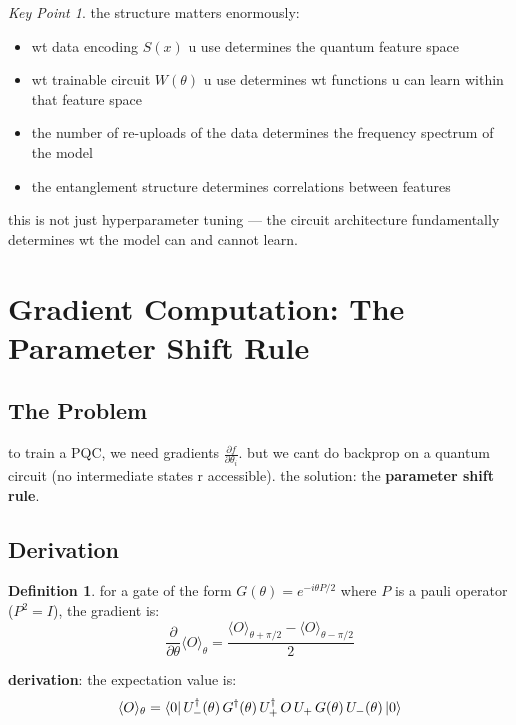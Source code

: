 \documentclass[11pt,a4paper]{article}
\theoremstyle{definition}
\newtheorem{definition}{Definition}[section]
\theoremstyle{remark}
\newtheorem*{keypoint}{Key Point}
\begin{document}
\begin{keypoint}
the structure matters enormously:
\begin{itemize}
    \item wt data encoding $S(x)$ u use determines the quantum feature space
    \item wt trainable circuit $W(\theta)$ u use determines wt functions u can learn within that feature space
    \item the number of re-uploads of the data determines the frequency spectrum of the model
    \item the entanglement structure determines correlations between features
\end{itemize}
this is not just hyperparameter tuning --- the circuit architecture fundamentally determines wt the model can and cannot learn.
\end{keypoint}

\section{Gradient Computation: The Parameter Shift Rule}

\subsection{The Problem}

to train a PQC, we need gradients $\frac{\partial f}{\partial \theta_i}$. but we cant do backprop on a quantum circuit (no intermediate states r accessible). the solution: the \textbf{parameter shift rule}.

\subsection{Derivation}

\begin{definition}
for a gate of the form $G(\theta) = e^{-i\theta P/2}$ where $P$ is a pauli operator ($P^2 = I$), the gradient is:
\[
\boxed{\frac{\partial}{\partial \theta}\langle O \rangle_\theta = \frac{\langle O \rangle_{\theta + \pi/2} - \langle O \rangle_{\theta - \pi/2}}{2}}
\]
\end{definition}

\textbf{derivation}: the expectation value is:
\[
\langle O \rangle_\theta = \bra{0} U^\dagger_{-}(\theta) \, G^\dagger(\theta) \, U^\dagger_{+} \, O \, U_{+} \, G(\theta) \, U_{-}(\theta) \ket{0}
\]
\end{document}
